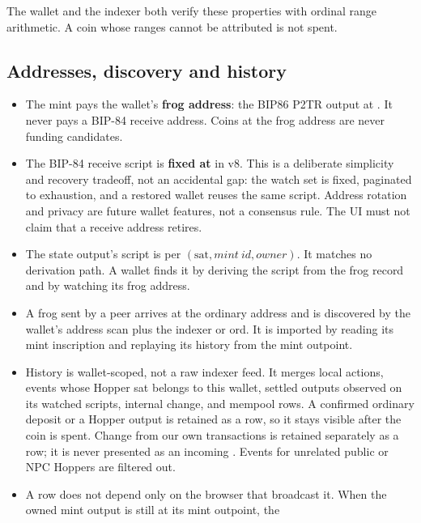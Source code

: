 The wallet and the indexer both verify these properties with ordinal range
arithmetic. A coin whose ranges cannot be attributed is not spent.

\subsection{Addresses, discovery and history}

\begin{itemize}[leftmargin=1.4em,itemsep=0.3em]
  \item The mint pays the wallet's \textbf{frog address}: the BIP86 P2TR
        output at . It never pays a BIP-84 receive address.
        Coins at the frog address are never funding candidates.
  \item The BIP-84 receive script is \textbf{fixed at } in
        v8. This is a deliberate simplicity and recovery tradeoff, not an
        accidental gap: the watch set is fixed, paginated to exhaustion, and
        a restored wallet reuses the same script. Address rotation and
        privacy are future wallet features, not a consensus rule. The UI
        must not claim that a receive address retires.
  \item The state output's script is per
        $(\mathrm{sat},\mathit{mint\ id},\mathit{owner})$. It matches no
        derivation path. A wallet finds it by deriving the script from the
        frog record and by watching its frog address.
  \item A frog sent by a peer arrives at the ordinary address and is
        discovered by the wallet's address scan plus the indexer or ord. It
        is imported by reading its mint inscription and replaying its history
        from the mint outpoint.
  \item History is wallet-scoped, not a raw indexer feed. It merges local
        actions, events whose Hopper sat belongs to this wallet, settled
        outputs observed on its watched scripts, internal change, and mempool
        rows. A confirmed ordinary deposit or a Hopper output is retained as
        a  row, so it stays visible after the coin is spent.
        Change from our own transactions is retained separately as a
         row; it is never presented as an incoming
        . Events for unrelated public or NPC Hoppers are
        filtered out.
  \item A  row does not depend only on the browser that broadcast
        it. When the owned mint output is still at its mint outpoint, the

\end{itemize}
